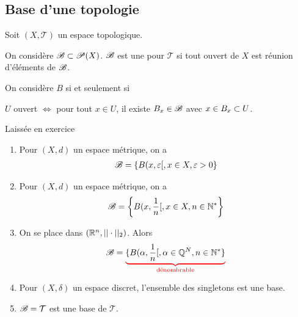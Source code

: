 \documentclass[french,a4paper,10pt]{article}
\begin{document}
		\subsection{Base d'une topologie}
			Soit $(X,\mathcal T)$ un espace topologique.
			
			\begin{definition}
				On considère $\mathscr{B}\subset \mathscr{P}(X)$. $\mathscr{B}$ est une  pour $\mathcal T$ si tout ouvert de $X$ est réunion d'éléments de $\mathscr{B}$.
			\end{definition}
			
			\begin{proposition}
				On considère $B$ si et seulement si
					\begin{center}
						$U$ ouvert $\Longleftrightarrow$ pour tout $x\in U$, il existe $B_x\in\mathscr{B}$ avec $x\in B_x\subset U$.
					\end{center}
			\end{proposition}
			\begin{myproof}
				Laissée en exercice
			\end{myproof}
		
			\begin{example}
				\begin{enumerate}[label=$(\roman*)$]
					\item 
					Pour $(X,d)$ un espace métrique, on a
					\[\begin{aligned}
						\mathscr{B}=\left\{B(x,\varepsilon[,x\in X,\varepsilon>0\right\}
					\end{aligned}\]
				
					\item 
					Pour $(X,d)$ un espace métrique, on a
					\[\begin{aligned}
						\mathscr{B}=\left\{B(x,\frac1n[,x\in X,n\in\mathbb{N}^\ast\right\}
					\end{aligned}\]
					\item On se place dans $(\mathbb{R}^n,||\cdot||_2)$. Alors
						\[\begin{aligned}
							\mathscr{B}=\color{red}\underbrace{\color{black}\{B(\alpha,\frac1n[,\alpha\in\mathbb{Q}^N,n\in \mathbb{N}^\ast\}}_{\text{dénombrable}}
						\end{aligned}\]
					\item Pour $(X,\delta)$ un espace discret, l'ensemble des singletons est une base.
					
					\item $\mathscr{B}=\mathcal T$ est une base de $\mathcal T$.
				\end{enumerate}
			\end{example}
		
\end{document}
